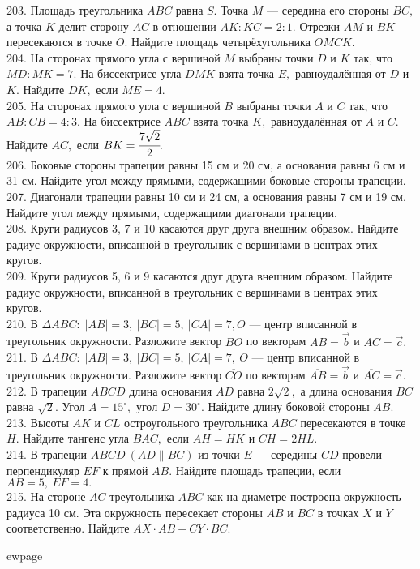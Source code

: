 203. Площадь треугольника $ABC$ равна $S.$ Точка $M$ --- середина его стороны $BC,$ а точка $K$ делит сторону $AC$ в отношении $AK:KC=2:1.$ Отрезки $AM$ и $BK$ пересекаются в точке $O.$ Найдите площадь четырёхугольника $OMCK.$\\
204. На сторонах прямого угла с вершиной $M$ выбраны точки $D$ и $K$ так, что $MD : MK = 7.$ На
биссектрисе угла $DMK$ взята точка $E,$ равноудалённая от $D$ и $K.$ Найдите $DK,$ если $ME = 4.$\\
205. На сторонах прямого угла с вершиной $B$ выбраны точки $A$ и $C$ так, что $AB : CB = 4 : 3.$ На
биссектрисе $ABC$ взята точка $K,$ равноудалённая от $A$ и $C.$ Найдите $AC,$ если $BK =\cfrac{7\sqrt{2}}{2}.$\\
206. Боковые стороны трапеции равны 15 см и 20 см, а основания равны 6 см и 31 см. Найдите угол между прямыми, содержащими боковые стороны трапеции.\\
207. Диагонали трапеции равны 10 см и 24 см, а основания равны 7 см и 19 см. Найдите угол между прямыми, содержащими диагонали трапеции.\\
208. Круги радиусов 3, 7 и 10 касаются друг друга внешним образом. Найдите радиус окружности, вписанной в треугольник с вершинами в центрах этих кругов.\\
209. Круги радиусов 5, 6 и 9 касаются друг друга внешним образом. Найдите радиус окружности, вписанной в треугольник с вершинами в центрах этих кругов.\\
210. В $\Delta ABC:\; |AB| = 3,\ |BC| = 5,\ |CA| = 7, O$ --- центр вписанной в треугольник окружности.
Разложите вектор  $\overline{BO}$ по векторам  $\overline{AB}=\vec{b}$ и  $\overline{AC}=\vec{c}.$\\
211. В $\Delta ABC:\; |AB| = 3,\ |BC| = 5,\ |CA| = 7,\ O$ --- центр вписанной в треугольник окружности. Разложите вектор $\overline{CO}$ по векторам
$\overline{AB}=\vec{b}$ и  $\overline{AC}=\vec{c}.$\\
212. В трапеции  $ABCD$ длина основания  $AD$ равна  $2\sqrt{2},$ а длина основания  $BC$ равна  $\sqrt{2}.$ Угол $A=15^\circ,$
угол $D=30^\circ.$ Найдите длину боковой стороны  $AB.$\\
213. Высоты  $AK$ и  $CL$ остроугольного треугольника  $ABC$ пересекаются в точке  $H.$ Найдите тангенс угла
$BAC,$ если  $AH=HK$ и  $CH=2HL.$\\
214. В трапеции  $ABCD\  (AD\parallel BC)$ из точки  $E$ --- середины  $CD$ провели перпендикуляр  $EF$ к прямой  $AB.$
Найдите площадь трапеции, если  $AB=5,\ EF=4.$\\
215. На стороне  $AC$ треугольника  $ABC$ как на диаметре построена окружность радиуса 10 см. Эта
окружность пересекает стороны  $AB$ и  $BC$ в точках  $X$ и  $Y$ соответственно. Найдите  $AX\cdot AB + CY\cdot BC.$

ewpage

